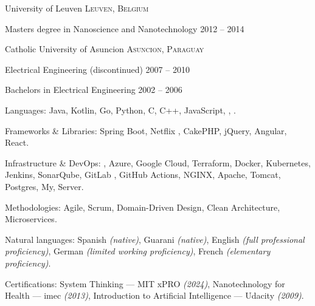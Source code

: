 \documentclass[10pt,a4paper]{article} %
\begin{document}

\spacedhrule{-0.2em}{-0.4em} %



\headedsection %
{University of Leuven}
{\textsc{Leuven, Belgium}} {

\headedsubsection %
{Masters degree in Nanoscience and Nanotechnology}
{2012 -- 2014}
{}
}


\headedsection %
{Catholic University of Asuncion}
{\textsc{Asuncion, Paraguay}} {

\headedsubsection %
{Electrical Engineering \textnormal{(discontinued)}}
{2007 -- 2010} {}

\headedsubsection %
{Bachelors in Electrical Engineering}
{2002 -- 2006} {}
}

\spacedhrule{0.5em}{-0.4em} %



\inlineheadsection
{Languages:}
{Java, Kotlin, Go, Python, C, C++, JavaScript, , .}

\inlineheadsection
{Frameworks \& Libraries:}
{Spring Boot, Netflix , CakePHP, jQuery, Angular, React.}

\inlineheadsection
{Infrastructure \& DevOps:}
{, Azure, Google Cloud, Terraform, Docker, Kubernetes, Jenkins, SonarQube, GitLab , GitHub Actions, NGINX, Apache, Tomcat, Postgres, My, Server.}

\inlineheadsection
{Methodologies:}
{Agile, Scrum, Domain-Driven Design, Clean Architecture, Microservices.}

\inlineheadsection
{Natural languages:}
{Spanish \textit{(native)}, Guarani \textit{(native)}, English \textit{(full professional proficiency)}, German \textit{(limited working proficiency)}, French \textit{(elementary proficiency)}.}

\inlineheadsection
{Certifications:}
{System Thinking --- MIT xPRO \textit{(2024)}, Nanotechnology for Health --- imec \textit{(2013)}, Introduction to Artificial Intelligence --- Udacity \textit{(2009)}.}

\end{document}
